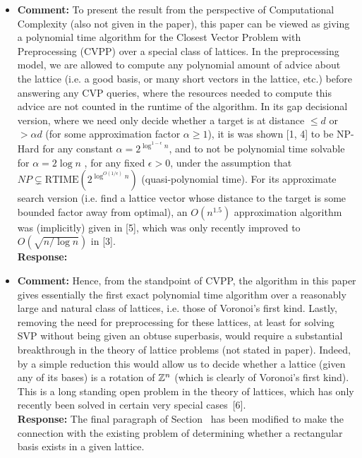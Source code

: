 \documentclass[a4paper,10pt]{article}
\begin{document}
\begin{itemize}
\item\textbf{Comment:} 
To present the result from the perspective of Computational Complexity (also not given in the
paper), this paper can be viewed as giving a polynomial time algorithm for the Closest Vector
Problem with Preprocessing (CVPP) over a special class of lattices. In the preprocessing model,
we are allowed to compute any polynomial amount of advice about the lattice (i.e. a good basis, or many short vectors in the lattice, etc.) before answering any CVP queries, where the resources needed to compute this advice are not counted in the runtime of the algorithm. In its
gap decisional version, where we need only decide whether a target is at distance $\leq d$ or $> \alpha d$
(for some approximation factor $\alpha \geq 1$), it is was shown [1, 4] to be NP-Hard for any constant $\alpha = 2^{\log^{1-\epsilon}n}$, and to not be polynomial time solvable for $\alpha = 2 \log n$ , for any fixed $\epsilon > 0$, under the assumption  that $NP \subsetneq \text{RTIME}(2^{\log^{O(1/\epsilon)}n})$ (quasi-polynomial time). For its approximate search version (i.e. find a lattice vector whose distance to the target is some bounded factor away from optimal), an $O(n^{1.5})$ approximation algorithm was (implicitly) given in [5], which was only recently improved to $O( \sqrt{ n / \log n} )$ in [3].
\\\textbf{Response:}

\item\textbf{Comment:} 
Hence, from the standpoint of CVPP, the algorithm in this paper gives essentially the first
exact polynomial time algorithm over a reasonably large and natural class of lattices, i.e. those
of Voronoi's first kind. Lastly, removing the need for preprocessing for these lattices, at least for
solving SVP without being given an obtuse superbasis, would require a substantial breakthrough
in the theory of lattice problems (not stated in paper). Indeed, by a simple reduction this would
allow us to decide whether a lattice (given any of its bases) is a rotation of ${\mathbb Z}^n$ (which is clearly
of Voronoi's first kind). This is a long standing open problem in the theory of lattices, which has
only recently been solved in certain very special cases~[6].
\\\textbf{Response:}
The final paragraph of Section~ has been modified to make the connection with the existing problem of determining whether a rectangular basis exists in a given lattice.


\end{itemize}
\end{document}
